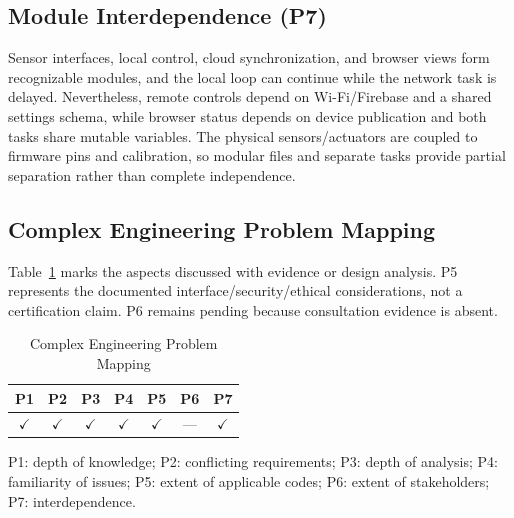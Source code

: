 \subsection{Module Interdependence (P7)}
Sensor interfaces, local control, cloud synchronization, and browser views form recognizable modules, and the local loop can continue while the network task is delayed. Nevertheless, remote controls depend on Wi-Fi/Firebase and a shared settings schema, while browser status depends on device publication and both tasks share mutable variables. The physical sensors/actuators are coupled to firmware pins and calibration, so modular files and separate tasks provide partial separation rather than complete independence.

\subsection{Complex Engineering Problem Mapping}
Table~\ref{tab:cep} marks the aspects discussed with evidence or design analysis. P5 represents the documented interface/security/ethical considerations, not a certification claim. P6 remains pending because consultation evidence is absent.
\begin{table}[!t]
\caption{Complex Engineering Problem Mapping}\label{tab:cep}
\centering\small
\begin{tabular}{ccccccc}
\toprule
P1 & P2 & P3 & P4 & P5 & P6 & P7 \\
\midrule
$\checkmark$ & $\checkmark$ & $\checkmark$ & $\checkmark$ & $\checkmark$ & --- & $\checkmark$ \\
\bottomrule
\end{tabular}
\par\smallskip\footnotesize
P1: depth of knowledge; P2: conflicting requirements; P3: depth of analysis; P4: familiarity of issues; P5: extent of applicable codes; P6: extent of stakeholders; P7: interdependence.
\end{table}
